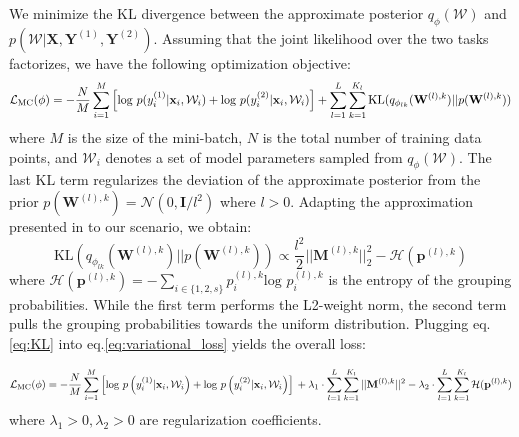 We minimize the KL divergence between the approximate posterior $q_{\phi}(\mathcal{W})$ and $p(\mathcal{W}|\textbf{X}, \mathbf{Y}^{(1)}, \mathbf{Y}^{(2)})$. Assuming that the joint likelihood over the two tasks factorizes, we have the following optimization objective:
\begin{equation}\label{eq:variational_loss}
\mathcal{L}_{\text{MC}}(\phi) = -\frac{N}{M}\sum_{i=1}^{M} \Big{[}\text{log } p(y^{(1)}_i|\mathbf{x}_i, \mathcal{W}_i) + \text{log }p(y^{(2)}_i|\mathbf{x}_i, \mathcal{W}_i)\Big{]} \\ + \sum_{l=1}^{L}\sum_{k=1}^{K_l}\text{KL}(q_{\phi_{lk}}(\mathbf{W}^{(l),k})||p(\mathbf{W}^{(l),k}))
\end{equation}
where $M$ is the size of the mini-batch, $N$ is the total number of training data points, and $\mathcal{W}_i$ denotes a set of model parameters sampled from $q_{\phi}(\mathcal{W})$. The last KL term regularizes the deviation of the approximate posterior from the prior $p(\mathbf{W}^{(l),k})=\mathcal{N}(0, \mathbf{I}/l^{2})$ where $l>0$. Adapting the approximation presented in \cite{gal2016uncertainty} to our scenario, we obtain:
\begin{equation}\label{eq:KL}
\text{KL}(q_{\phi_{lk}}(\mathbf{W}^{(l),k})||p(\mathbf{W}^{(l),k})) \propto \frac{l^2}{2}||\mathbf{M}^{(l),k}||^{2}
_{2} - \mathcal{H}(\mathbf{p}^{(l),k})
\end{equation}
where $\mathcal{H}(\mathbf{p}^{(l),k})=-\sum_{i\in \{1,2,s\}}p^{(l),k}_i\text{log }p^{(l),k}_i$ is the entropy of the grouping probabilities. While the first term performs the L2-weight norm, the second term pulls the grouping probabilities towards the uniform distribution. Plugging eq.\eqref{eq:KL} into eq.\eqref{eq:variational_loss} yields the overall loss: 

\begin{equation}\label{eq:total_loss}
\mathcal{L}_{\text{MC}}(\phi) = -\frac{N}{M}\sum_{i=1}^{M} \left[\log\text{\,} p\left(y^{(1)}_i|\mathbf{x}_i, \mathcal{W}_i\right) + \log\text{\,} p\left(y^{(2)}_i|\mathbf{x}_i, \mathcal{W}_i\right)\right] \\ + \lambda_{1} \cdot \sum_{l=1}^{L}\sum_{k=1}^{K_l}||\mathbf{M}^{(l),k}||^{2} - \lambda_{2} \cdot \sum_{l=1}^{L}\sum_{k=1}^{K_l}\mathcal{H}(\mathbf{p}^{(l),k})
\end{equation}
where $\lambda_1>0, \lambda_2>0$ are regularization coefficients. 

